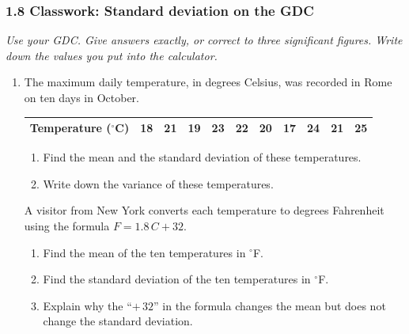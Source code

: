 \documentclass[12pt, twoside]{article}
\begin{document}
\subsubsection*{1.8 Classwork: Standard deviation on the GDC}

\emph{Use your GDC. Give answers exactly, or correct to three significant
figures. Write down the values you put into the calculator.}

\begin{enumerate}[itemsep=0.15cm]

\item[1.]

The maximum daily temperature, in degrees Celsius, was recorded in Rome on
ten days in October.

\begin{center}
\setlength{\tabcolsep}{8pt}\renewcommand{\arraystretch}{1.2}
\begin{tabular}{|l|c|c|c|c|c|c|c|c|c|c|}
\hline
Temperature ($^{\circ}$C) & 18 & 21 & 19 & 23 & 22 & 20 & 17 & 24 & 21 & 25 \\
\hline
\end{tabular}
\end{center}

\begin{enumerate}[itemsep=0.1cm]
  \item Find the mean and the standard deviation of these temperatures.
  \item Write down the variance of these temperatures.
\end{enumerate}

A visitor from New York converts each temperature to degrees Fahrenheit
using the formula $F = 1.8\,C + 32$.

\begin{enumerate}[resume, itemsep=0.1cm]
  \item Find the mean of the ten temperatures in $^{\circ}$F.
  \item Find the standard deviation of the ten temperatures in $^{\circ}$F.
  \item Explain why the ``$+\,32$'' in the formula changes the mean but
  does not change the standard deviation.
\end{enumerate}



\end{enumerate}
\end{document}
